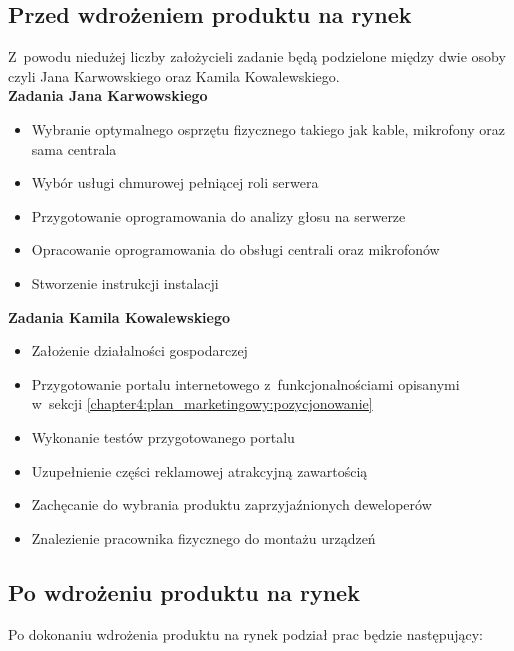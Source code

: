 \documentclass[../main.tex]{subfiles}
\begin{document}
 {

    \subsection{Przed wdrożeniem produktu na rynek}
    \label{chapter5:system_biznesowy:przed_wdrozeniem} {
        Z~powodu niedużej liczby założycieli zadanie będą podzielone między dwie osoby
        czyli Jana Karwowskiego oraz Kamila Kowalewskiego.\\

        \noindent\textbf{Zadania Jana Karwowskiego}
        \begin{itemize}
            \item Wybranie optymalnego osprzętu fizycznego takiego jak kable, mikrofony
            oraz sama centrala
            \item Wybór usługi chmurowej pełniącej roli serwera
            \item Przygotowanie oprogramowania do analizy głosu na serwerze
            \item Opracowanie oprogramowania do obsługi centrali oraz mikrofonów
            \item Stworzenie instrukcji instalacji
        \end{itemize}
        \bigskip

        \noindent\textbf{Zadania Kamila Kowalewskiego}
        \begin{itemize}
            \item Założenie działalności gospodarczej
            \item Przygotowanie portalu internetowego z~funkcjonalnościami opisanymi
            w~sekcji \ref{chapter4:plan_marketingowy:pozycjonowanie}
            \item Wykonanie testów przygotowanego portalu
            \item Uzupełnienie części reklamowej atrakcyjną zawartością
            \item Zachęcanie do wybrania produktu zaprzyjaźnionych deweloperów
            \item Znalezienie pracownika fizycznego do montażu urządzeń
        \end{itemize}
        \bigskip
    }

    \subsection{Po wdrożeniu produktu na rynek}
    \label{chapter5:system_biznesowy:po_wdrozeniu} {
        Po dokonaniu wdrożenia produktu na rynek podział prac będzie następujący:\\

}}
\end{document}
